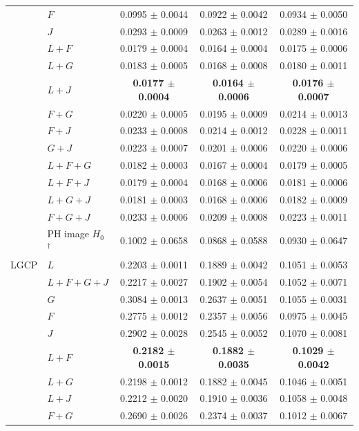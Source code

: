 \documentclass[10pt,a4paper]{article}
\newcommand{\B}[1]{\textbf{#1}}
\begin{document}
\begin{longtable}{@{}ll ccc@{}}
 & $F$ & 0.0995 $\pm$ 0.0044 & 0.0922 $\pm$ 0.0042 & 0.0934 $\pm$ 0.0050\\
 & $J$ & 0.0293 $\pm$ 0.0009 & 0.0263 $\pm$ 0.0012 & 0.0289 $\pm$ 0.0016\\
 & $L{+}F$ & 0.0179 $\pm$ 0.0004 & 0.0164 $\pm$ 0.0004 & 0.0175 $\pm$ 0.0006\\
 & $L{+}G$ & 0.0183 $\pm$ 0.0005 & 0.0168 $\pm$ 0.0008 & 0.0180 $\pm$ 0.0011\\
 & \B{$L{+}J$} & \B{0.0177 $\pm$ 0.0004} & \B{0.0164 $\pm$ 0.0006} & \B{0.0176 $\pm$ 0.0007}\\
 & $F{+}G$ & 0.0220 $\pm$ 0.0005 & 0.0195 $\pm$ 0.0009 & 0.0214 $\pm$ 0.0013\\
 & $F{+}J$ & 0.0233 $\pm$ 0.0008 & 0.0214 $\pm$ 0.0012 & 0.0228 $\pm$ 0.0011\\
 & $G{+}J$ & 0.0223 $\pm$ 0.0007 & 0.0201 $\pm$ 0.0006 & 0.0220 $\pm$ 0.0006\\
 & $L{+}F{+}G$ & 0.0182 $\pm$ 0.0003 & 0.0167 $\pm$ 0.0004 & 0.0179 $\pm$ 0.0005\\
 & $L{+}F{+}J$ & 0.0179 $\pm$ 0.0004 & 0.0168 $\pm$ 0.0006 & 0.0181 $\pm$ 0.0006\\
 & $L{+}G{+}J$ & 0.0181 $\pm$ 0.0003 & 0.0168 $\pm$ 0.0006 & 0.0182 $\pm$ 0.0009\\
 & $F{+}G{+}J$ & 0.0233 $\pm$ 0.0006 & 0.0209 $\pm$ 0.0008 & 0.0223 $\pm$ 0.0011\\
 & PH image $H_0$\,$^\dagger$ & 0.1002 $\pm$ 0.0658 & 0.0868 $\pm$ 0.0588 & 0.0930 $\pm$ 0.0647\\
\midrule
LGCP & $L$ & 0.2203 $\pm$ 0.0011 & 0.1889 $\pm$ 0.0042 & 0.1051 $\pm$ 0.0053\\
 & $L{+}F{+}G{+}J$ & 0.2217 $\pm$ 0.0027 & 0.1902 $\pm$ 0.0054 & 0.1052 $\pm$ 0.0071\\
 & $G$ & 0.3084 $\pm$ 0.0013 & 0.2637 $\pm$ 0.0051 & 0.1055 $\pm$ 0.0031\\
 & $F$ & 0.2775 $\pm$ 0.0012 & 0.2357 $\pm$ 0.0056 & 0.0975 $\pm$ 0.0045\\
 & $J$ & 0.2902 $\pm$ 0.0028 & 0.2545 $\pm$ 0.0052 & 0.1070 $\pm$ 0.0081\\
 & \B{$L{+}F$} & \B{0.2182 $\pm$ 0.0015} & \B{0.1882 $\pm$ 0.0035} & \B{0.1029 $\pm$ 0.0042}\\
 & $L{+}G$ & 0.2198 $\pm$ 0.0012 & 0.1882 $\pm$ 0.0045 & 0.1046 $\pm$ 0.0051\\
 & $L{+}J$ & 0.2212 $\pm$ 0.0020 & 0.1910 $\pm$ 0.0036 & 0.1058 $\pm$ 0.0048\\
 & $F{+}G$ & 0.2690 $\pm$ 0.0026 & 0.2374 $\pm$ 0.0037 & 0.1012 $\pm$ 0.0067\\

\end{longtable}
\end{document}
